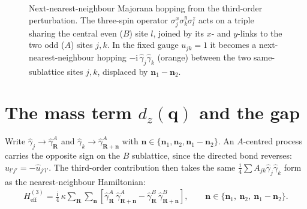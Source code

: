 \documentclass[
  aps,
  prl,
  preprint,
  amsmath,
  amssymb,
  superscriptaddress,
  floatfix
]{revtex4-2}
\newcommand{\ii}{\mathrm{i}}
\newcommand{\oga}{\hat \gamma}
\begin{document}
\begin{figure}[H]
\caption{Next-nearest-neighbour Majorana hopping from the third-order
  perturbation. The three-spin operator $\sigma_j^x\sigma_k^y\sigma_l^z$
  acts on a triple sharing the central even ($B$) site $l$, joined by its
  $x$- and $y$-links to the two odd ($A$) sites $j,k$. In the fixed gauge
  $u_{jk}=1$ it becomes a next-nearest-neighbour hopping
  $-\ii\,\oga_j\oga_k$ (orange) between the two same-sublattice sites
  $j,k$, displaced by $\bm n_1-\bm n_2$.}
\label{fig:sm_nnn_hop}
\end{figure}

\section{The mass term \texorpdfstring{$d_z(\bm q)$}{dz(q)} and the gap}
\label{sm:dz}

Write $\oga_j\to\oga^A_{\bm R}$ and $\oga_k\to\oga^A_{\bm R+\bm n}$ with
$\bm n\in\{\bm n_1,\bm n_2,\bm n_1-\bm n_2\}$. An $A$-centred process
carries the opposite sign on the $B$ sublattice, since the directed bond
reverses: $\hat u_{l'j'}=-\hat u_{j'l'}$. The third-order contribution then takes the same
$\tfrac{\ii}{4}\sum A_{jk}\oga_j\oga_k$ form as the nearest-neighbour
Hamiltonian:
\begin{align}
  H^{(3)}_{\text{eff}} = \frac{\ii}{4}\,\kappa \sum_{\bm R}\sum_{\bm n}
  \left[\oga_{\bm R}^{A}\,\oga_{\bm R+\bm n}^{A}
      - \oga_{\bm R}^{B}\,\oga_{\bm R+\bm n}^{B}\right],
  \qquad
  \bm n \in \{\bm n_1,\ \bm n_2,\ \bm n_1-\bm n_2\} .
  \label{eq:sm_H3_realspace}
\end{align}
\end{document}
